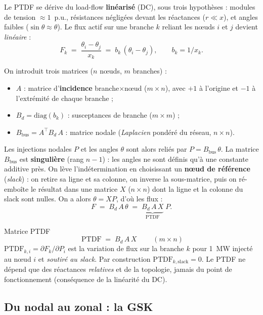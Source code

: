 \documentclass[11pt,a4paper]{article}
\begin{document}
Le PTDF se dérive du load-flow \textbf{linéarisé} (DC), sous trois
hypothèses : modules de tension $\approx 1$~p.u., résistances négligées
devant les réactances ($r \ll x$), et angles faibles
($\sin\theta \approx \theta$). Le flux actif sur une branche $k$ reliant
les n\oe{}uds $i$ et $j$ devient \emph{linéaire} :
\[
  F_k \;=\; \frac{\theta_i - \theta_j}{x_k}
       \;=\; b_k\,(\theta_i - \theta_j),
       \qquad b_k = 1/x_k .
\]

On introduit trois matrices ($n$ n\oe{}uds, $m$ branches) :
\begin{itemize}[nosep,leftmargin=1.4em]
  \item $A$ : matrice d'\textbf{incidence} branche$\times$n\oe{}ud
        ($m\times n$), avec $+1$ à l'origine et $-1$ à l'extrémité de
        chaque branche ;
  \item $B_d = \mathrm{diag}(b_k)$ : susceptances de branche
        ($m\times m$) ;
  \item $B_{\mathrm{bus}} = A^{\top} B_d\, A$ : matrice nodale
        (\emph{Laplacien} pondéré du réseau, $n\times n$).
\end{itemize}

Les injections nodales $P$ et les angles $\theta$ sont alors reliés par
$P = B_{\mathrm{bus}}\,\theta$. La matrice $B_{\mathrm{bus}}$ est
\textbf{singulière} (rang $n-1$) : les angles ne sont définis qu'à une
constante additive près. On lève l'indétermination en choisissant un
\textbf{n\oe{}ud de référence} (\emph{slack}) : on retire sa ligne et sa
colonne, on inverse la sous-matrice, puis on ré-emboîte le résultat dans
une matrice $X$ ($n\times n$) dont la ligne et la colonne du slack sont
nulles. On a alors $\theta = X P$, d'où les flux :
\[
  F \;=\; B_d\, A\, \theta \;=\; \underbrace{B_d\, A\, X}_{\displaystyle \mathrm{PTDF}}\; P .
\]

\begin{defbox}{Matrice PTDF}
\[
  \boxed{\;\mathrm{PTDF} \;=\; B_d\, A\, X\;}\qquad (m\times n)
\]
$\mathrm{PTDF}_{k,i} = \partial F_k/\partial P_i$ est la variation de flux
sur la branche $k$ pour 1~MW injecté au n\oe{}ud $i$ et \emph{soutiré au
slack}. Par construction $\mathrm{PTDF}_{k,\text{slack}} = 0$. Le PTDF ne
dépend que des réactances \emph{relatives} et de la topologie, jamais du
point de fonctionnement (conséquence de la linéarité du DC).
\end{defbox}

\subsection{Du nodal au zonal : la GSK}
\label{sec:gsk}
\end{document}
